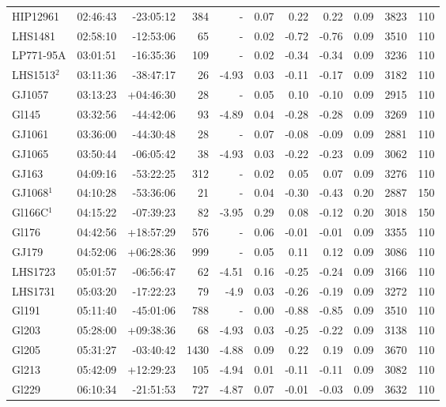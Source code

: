 \documentclass{aa}
\begin{document}
{\begin{longtable}{l r r r r r r r r r r}
HIP12961 & 02:46:43 & -23:05:12 & 384 &    - & 0.07 & 0.22 & 0.22 & 0.09 & 3823 &  110 \\
LHS1481 & 02:58:10 & -12:53:06 & 65 &    - & 0.02 & -0.72 & -0.76 & 0.09 & 3510 &  110 \\
LP771-95A & 03:01:51 & -16:35:36 & 109 &    - & 0.02 & -0.34 & -0.34 & 0.09 & 3236 &  110 \\
LHS1513$^2$ & 03:11:36 & -38:47:17 & 26 & -4.93 & 0.03 & -0.11 & -0.17 & 0.09 & 3182 &  110 \\
GJ1057 & 03:13:23 & +04:46:30 & 28 &    - & 0.05 & 0.10 & -0.10 & 0.09 & 2915 &  110 \\
Gl145 & 03:32:56 & -44:42:06 & 93 & -4.89 & 0.04 & -0.28 & -0.28 & 0.09 & 3269 &  110 \\
GJ1061 & 03:36:00 & -44:30:48 & 28 &    - & 0.07 & -0.08 & -0.09 & 0.09 & 2881 &  110 \\
GJ1065 & 03:50:44 & -06:05:42 & 38 & -4.93 & 0.03 & -0.22 & -0.23 & 0.09 & 3062 &  110 \\
GJ163 & 04:09:16 & -53:22:25 & 312 &    - & 0.02 & 0.05 & 0.07 & 0.09 & 3276 &  110 \\
GJ1068$^1$ & 04:10:28 & -53:36:06 & 21 &    - & 0.04 & -0.30 & -0.43 & 0.20 & 2887 &  150 \\
Gl166C$^1$ & 04:15:22 & -07:39:23 & 82 & -3.95 & 0.29 & 0.08 & -0.12 & 0.20 & 3018 &  150 \\
Gl176 & 04:42:56 & +18:57:29 & 576 &    - & 0.06 & -0.01 & -0.01 & 0.09 & 3355 &  110 \\
GJ179 & 04:52:06 & +06:28:36 & 999 &    - & 0.05 & 0.11 & 0.12 & 0.09 & 3086 &  110 \\
LHS1723 & 05:01:57 & -06:56:47 & 62 & -4.51 & 0.16 & -0.25 & -0.24 & 0.09 & 3166 &  110 \\
LHS1731 & 05:03:20 & -17:22:23 & 79 & -4.9 & 0.03 & -0.26 & -0.19 & 0.09 & 3272 &  110 \\
Gl191 & 05:11:40 & -45:01:06 & 788 &    - & 0.00 & -0.88 & -0.85 & 0.09 & 3510 &  110 \\
Gl203 & 05:28:00 & +09:38:36 & 68 & -4.93 & 0.03 & -0.25 & -0.22 & 0.09 & 3138 &  110 \\
Gl205 & 05:31:27 & -03:40:42 & 1430 & -4.88 & 0.09 & 0.22 & 0.19 & 0.09 & 3670 &  110 \\
Gl213 & 05:42:09 & +12:29:23 & 105 & -4.94 & 0.01 & -0.11 & -0.11 & 0.09 & 3082 &  110 \\
Gl229 & 06:10:34 & -21:51:53 & 727 & -4.87 & 0.07 & -0.01 & -0.03 & 0.09 & 3632 &  110 \\

\end{longtable}}
\end{document}
